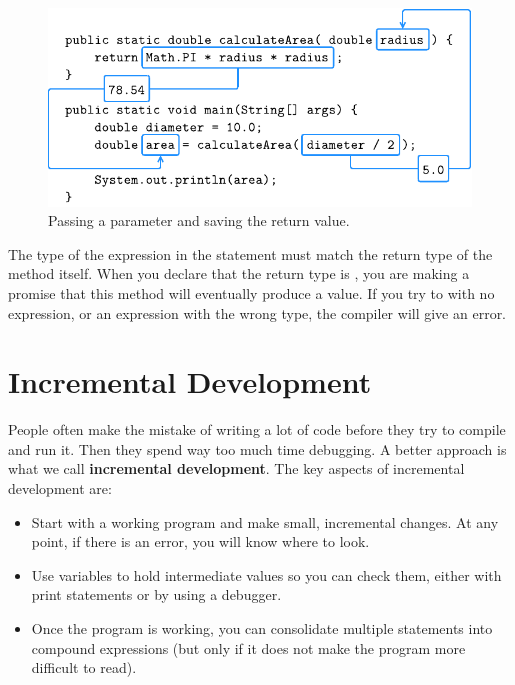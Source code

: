 \begin{figure}[!ht]
\begin{center}
\includegraphics{figs/param.pdf}
\caption{Passing a parameter and saving the return value.}
\label{fig.param}
\end{center}
\end{figure}

The type of the expression in the  statement must match the return type of the method itself.
When you declare that the return type is , you are making a promise that this method will eventually produce a  value.
If you try to  with no expression, or  an expression with the wrong type, the compiler will give an error.


\section{Incremental Development}
\label{distance}


People often make the mistake of writing a lot of code before they try to compile and run it.
Then they spend way too much time debugging.
A better approach is what we call {\bf incremental development}.
The key aspects of incremental development are:

\begin{itemize}

\item Start with a working program and make small, incremental changes.
At any point, if there is an error, you will know where to look.

\item Use variables to hold intermediate values so you can check them, either with print statements or by using a debugger.

\item Once the program is working, you can consolidate multiple statements into compound expressions (but only if it does not make the program more difficult to read).

\end{itemize}

